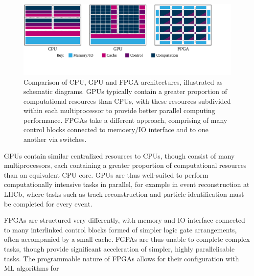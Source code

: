 \begin{figure}[h!]
    \centering
    \includegraphics[width=\linewidth,clip]{figures/architectures-diagram.pdf}
    \caption{Comparison of CPU, GPU and FPGA architectures, illustrated as schematic diagrams. GPUs typically contain a greater proportion of computational resources than CPUs, with these resources subdivided within each multiprocessor to provide better parallel computing performance. FPGAs take a different approach, comprising of many control blocks connected to memoery/IO interface and to one another via switches. \cite{architectures}}
    \label{architectures}       %
\end{figure}

GPUs contain similar centralized resources to CPUs, though consist of many multiprocessors, each containing a greater proportion of computational resources than an equivalent CPU core. GPUs are thus well-suited to perform computationally intensive tasks in parallel, for example in event reconstruction at LHCb, where tasks such as track reconstruction and particle identification must be completed for every event. \cite{vomBruch-gpus} \par
FPGAs are structured very differently, with memory and IO interface connected to many interlinked control blocks formed of simpler logic gate arrangements, often accompanied by a small cache. FGPAs are thus unable to complete complex tasks, though provide significant acceleration of simpler, highly parallelisable tasks. The programmable nature of FPGAs allows for their configuration with ML algorithms for \cite{duarte-fpgas, muons-fpgas}  \par